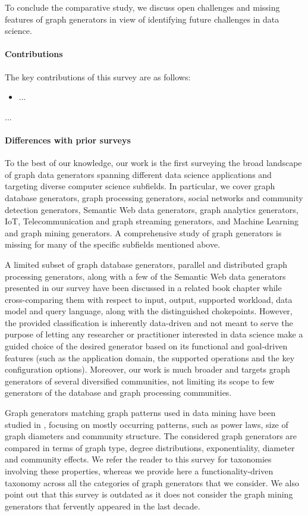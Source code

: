 To conclude the comparative study, we discuss open challenges and missing features of graph generators in view of identifying future challenges in data science.


\paragraph*{Contributions} The key contributions of this survey are as follows:
\begin{itemize}
  \item ...
\end{itemize}

...

\paragraph*{Differences with prior surveys}

To the best of our knowledge, our work is the first surveying the broad
landscape of graph data generators spanning different data science applications and
targeting diverse computer science subfields. In particular, we cover graph database
generators, graph processing generators, social networks and community detection
generators, Semantic Web data generators, graph
analytics generators, IoT, Telecommunication and graph streaming generators,
and Machine Learning and graph mining generators. A comprehensive study of
graph generators is missing for many of the specific subfields mentioned
above.

A limited subset of graph database
generators, parallel and distributed graph processing generators, along
with a few of the Semantic Web data generators presented in our survey have
been discussed in a related book chapter
\cite{BFHI18} while cross-comparing them with respect to input, output,
supported workload, data model and query language, along with the
distinguished chokepoints. However, the provided classification is
inherently data-driven and not meant to serve the purpose of letting any
researcher or practitioner interested in data science make a guided
choice of the desired
generator based on its functional and goal-driven features (such as the application domain,
the supported operations and the key configuration options).
Moreover, our work is much broader and targets graph generators of several
diversified communities, not limiting its scope to few generators of the database
and graph processing communities.

Graph generators matching graph patterns used in data mining have been
studied in \cite{Chakrabarti:2006:GML:1132952.1132954},
focusing on mostly occurring patterns, such as power laws, size of graph diameters
and community structure. The considered graph generators are compared in
terms of graph type, degree distributions, exponentiality, diameter and
community effects. We refer the reader to this survey for taxonomies
involving these properties, whereas we provide here a functionality-driven
taxonomy across all the categories of graph generators that we consider.
We also point out that this survey is outdated as it does not consider the
graph mining generators that fervently appeared in the last decade.

